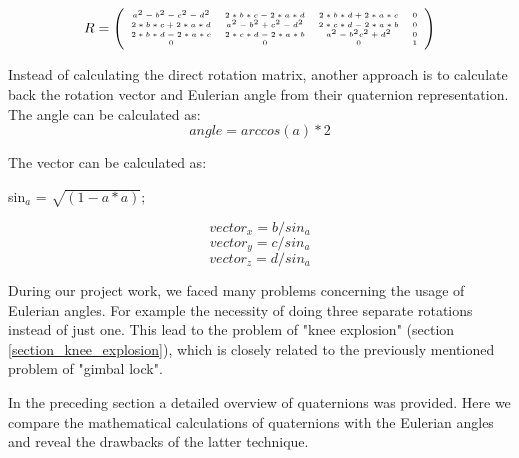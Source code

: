 \documentclass[times, 10pt,twocolumn]{article}
\begin{document}
\[ R = \left( \begin{tiny}\begin{array}{cccc}
a^{2}-b^{2}-c^{2}-d^{2} & 2 \ast b \ast c-2 \ast a \ast d & 2 \ast b \ast d+2 \ast a \ast c & 0 \\
2 \ast b \ast c+2 \ast a \ast d & a^{2}-b^{2}+c^{2}-d^{2} & 2 \ast c \ast d-2 \ast a \ast b & 0 \\
2 \ast b \ast d-2 \ast a \ast c & 2 \ast c \ast d-2 \ast a \ast b & a^{2}-b^{2}c^{2}+d^{2} & 0 \\
0 & 0 & 0 & 1
\end{array}\end{tiny} \right)\]

Instead of calculating the direct rotation matrix, another approach is to calculate back the rotation vector and Eulerian angle from their quaternion representation. The angle can be calculated as:
\begin{equation}
\label{eq_quant1}
	angle = arccos(a) \ast 2
\end{equation}

The vector can be calculated as:

\begin{description}
    \setlength{\itemsep}{0pt}
    \item sin$_a$ = $\sqrt{(1 - a \ast a)}$;
\end{description}

\begin{equation}
\label{eq_quant2}
	vector_x = b / sin_a
\end{equation}
\begin{equation}
\label{eq_quant3}
	vector_y = c / sin_a
\end{equation}
\begin{equation}
\label{eq_quant4}
	vector_z = d / sin_a
\end{equation}

\label{QuaternionsVsEuler}

During our project work, we faced many problems concerning the usage of Eulerian angles. For example the necessity of doing three separate rotations instead of just one. This lead to the problem of "knee explosion" (section \ref{section_knee_explosion}), which is closely related to the previously mentioned problem of "gimbal lock".

In the preceding section a detailed overview of quaternions was provided. Here we compare the mathematical calculations of quaternions with the Eulerian angles and reveal the drawbacks of the latter technique.
\end{document}

